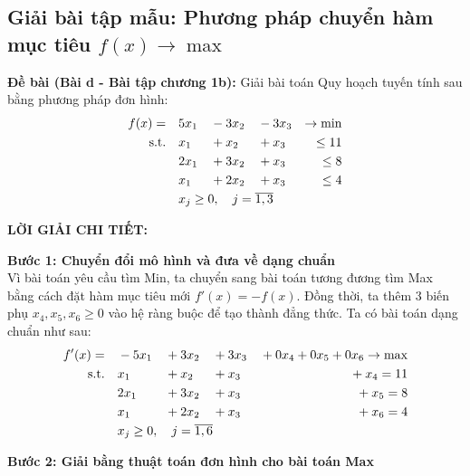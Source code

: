 \subsection[Giải bài tập mẫu: Phương pháp chuyển hàm mục tiêu f(x) -> max]{Giải bài tập mẫu: Phương pháp chuyển hàm mục tiêu $f(x) \rightarrow \max$}

\textbf{Đề bài (Bài d - Bài tập chương 1b):} Giải bài toán Quy hoạch tuyến tính sau bằng phương pháp đơn hình:
\begin{alignat*}{4}
    f(x) = \quad & 5x_1 & {}-{} & 3x_2 & {}-{} & 3x_3 & \rightarrow \min \\
    \text{s.t.} \quad & x_1 & {}+{} & x_2 & {}+{} & x_3 & \le 11 \\
    & 2x_1 & {}+{} & 3x_2 & {}+{} & x_3 & \le 8 \\
    & x_1 & {}+{} & 2x_2 & {}+{} & x_3 & \le 4 \\
    & \rlap{$x_j \ge 0, \quad j = \overline{1,3}$}
\end{alignat*}

\textbf{LỜI GIẢI CHI TIẾT:}

\textbf{Bước 1: Chuyển đổi mô hình và đưa về dạng chuẩn} \\
Vì bài toán yêu cầu tìm Min, ta chuyển sang bài toán tương đương tìm Max bằng cách đặt hàm mục tiêu mới $f'(x) = -f(x)$. Đồng thời, ta thêm 3 biến phụ $x_4, x_5, x_6 \ge 0$ vào hệ ràng buộc để tạo thành đẳng thức. Ta có bài toán dạng chuẩn như sau:
\begin{alignat*}{4}
    f'(x) = \quad & -5x_1 & {}+{} & 3x_2 & {}+{} & 3x_3 & {}+{} 0x_4 + 0x_5 + 0x_6 \rightarrow \max \\
    \text{s.t.} \quad & x_1 & {}+{} & x_2 & {}+{} & x_3 & {}+{} x_4 = 11 \\
    & 2x_1 & {}+{} & 3x_2 & {}+{} & x_3 & {}+{} x_5 = 8 \\
    & x_1 & {}+{} & 2x_2 & {}+{} & x_3 & {}+{} x_6 = 4 \\
    & \rlap{$x_j \ge 0, \quad j = \overline{1,6}$}
\end{alignat*}

\textbf{Bước 2: Giải bằng thuật toán đơn hình cho bài toán Max}

